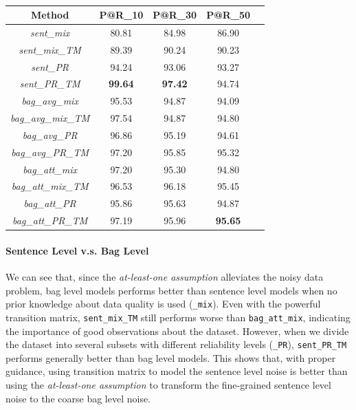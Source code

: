 \begin{table}
\centering
\small{
\begin{tabular}{|c|c|c|c|c|}
\hline
\textbf{Method}							& \textbf{P@R\_10} 		& \textbf{P@R\_30} 			& \textbf{P@R\_50} \\
\hline
\textit{sent\_mix} 						&80.81	&84.98	&86.90 	\\
\hline
\textit{sent\_mix\_TM} 				&89.39	&90.24	&90.23 	\\
\hline
\textit{sent\_PR} 						&94.24	&93.06	&93.27 	\\
\hline
\textit{sent\_PR\_TM} 				&\textbf{99.64}	&\textbf{97.42}	&94.74 	\\
\hline
\textit{bag\_avg\_mix} 				&95.53	&94.87	&94.09 	\\
\hline
\textit{bag\_avg\_mix\_TM} 		&97.54	&94.87	&94.80 	\\
\hline
\textit{bag\_avg\_PR} 				&96.86	&95.19	&94.61 	\\
\hline
\textit{bag\_avg\_PR\_TM} 			&97.20	&95.85	&95.32 	\\
\hline
\textit{bag\_att\_mix} 				&97.20	&95.30	&94.80 	\\
\hline
\textit{bag\_att\_mix\_TM} 		&96.53	&96.18	&95.45 	\\
\hline
\textit{bag\_att\_PR} 				&95.86	&95.63	&94.87 	\\
\hline
\textit{bag\_att\_PR\_TM} 			&97.19	&95.96	&\textbf{95.65} 	\\
\hline
\end{tabular}
}
\caption{}
\label{overall_TimeRE}
\end{table}

\paragraph{Sentence Level v.s. Bag Level}
 We can see that, since the \textit{at-least-one assumption} alleviates the noisy data problem, bag level models performs better than sentence level models when no prior knowledge about data quality is used (\texttt{\_mix}). Even with the powerful transition matrix, \texttt{sent\_mix\_TM} still performs worse than \texttt{bag\_att\_mix}, indicating the importance of good observations about the dataset. However, when we divide the dataset into several subsets with different reliability levels (\texttt{\_PR}), \texttt{sent\_PR\_TM} performs generally better than bag level models.
This shows that, with proper guidance, using transition matrix to model the sentence level noise is better than using the \textit{at-least-one assumption} to transform the fine-grained sentence level noise to the coarse bag level noise.




